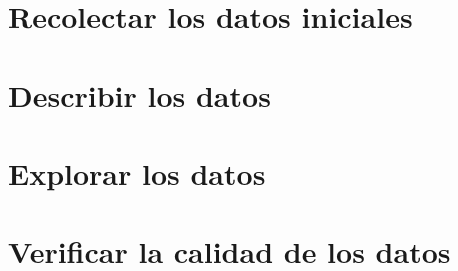\documentclass[11pt,letterpaper,DIV=12]{scrartcl}
\begin{document}


\tableofcontents
\clearpage




\section{Recolectar los datos iniciales}



\section{Describir los datos}



\section{Explorar los datos}



\section{Verificar la calidad de los datos}




\printbibliography
\end{document}
